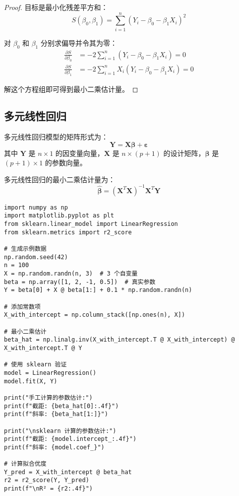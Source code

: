 \begin{proof}
目标是最小化残差平方和：
\[
S(\beta_0, \beta_1) = \sum_{i=1}^n (Y_i - \beta_0 - \beta_1 X_i)^2
\]

对 $\beta_0$ 和 $\beta_1$ 分别求偏导并令其为零：
\begin{align}
\frac{\partial S}{\partial \beta_0} &= -2\sum_{i=1}^n (Y_i - \beta_0 - \beta_1 X_i) = 0 \\
\frac{\partial S}{\partial \beta_1} &= -2\sum_{i=1}^n X_i(Y_i - \beta_0 - \beta_1 X_i) = 0
\end{align}

解这个方程组即可得到最小二乘估计量。
\end{proof}

\subsection{多元线性回归}

\begin{definition}[多元线性回归模型]\label{def:multiple-linear-regression}
多元线性回归模型的矩阵形式为：
\[
\mathbf{Y} = \mathbf{X}\boldsymbol{\beta} + \boldsymbol{\varepsilon}
\]
其中 $\mathbf{Y}$ 是 $n \times 1$ 的因变量向量，$\mathbf{X}$ 是 $n \times (p+1)$ 的设计矩阵，$\boldsymbol{\beta}$ 是 $(p+1) \times 1$ 的参数向量。
\end{definition}

\begin{theorem}[多元线性回归的最小二乘估计]\label{thm:multiple-least-squares}
多元线性回归的最小二乘估计量为：
\[
\hat{\boldsymbol{\beta}} = (\mathbf{X}^T\mathbf{X})^{-1}\mathbf{X}^T\mathbf{Y}
\]
\end{theorem}

\begin{codebox}[title=多元线性回归的 Python 实现]
\begin{verbatim}
import numpy as np
import matplotlib.pyplot as plt
from sklearn.linear_model import LinearRegression
from sklearn.metrics import r2_score

# 生成示例数据
np.random.seed(42)
n = 100
X = np.random.randn(n, 3)  # 3 个自变量
beta = np.array([1, 2, -1, 0.5])  # 真实参数
Y = beta[0] + X @ beta[1:] + 0.1 * np.random.randn(n)

# 添加常数项
X_with_intercept = np.column_stack([np.ones(n), X])

# 最小二乘估计
beta_hat = np.linalg.inv(X_with_intercept.T @ X_with_intercept) @ X_with_intercept.T @ Y

# 使用 sklearn 验证
model = LinearRegression()
model.fit(X, Y)

print("手工计算的参数估计:")
print(f"截距: {beta_hat[0]:.4f}")
print(f"斜率: {beta_hat[1:]}")

print("\nsklearn 计算的参数估计:")
print(f"截距: {model.intercept_:.4f}")
print(f"斜率: {model.coef_}")

# 计算拟合优度
Y_pred = X_with_intercept @ beta_hat
r2 = r2_score(Y, Y_pred)
print(f"\nR² = {r2:.4f}")
\end{verbatim}
\end{codebox}

